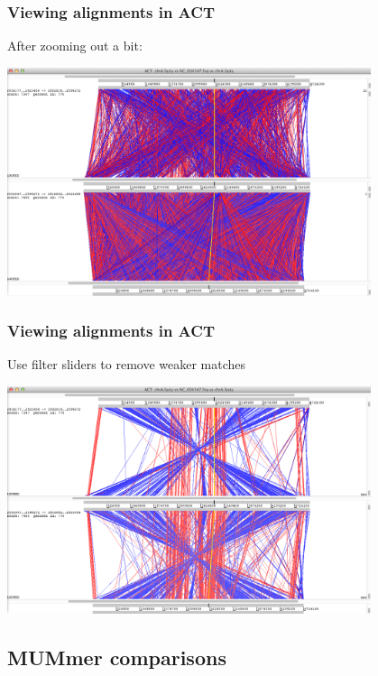 \documentclass[table]{beamer}
\begin{document}
    \begin{frame}
      \frametitle{Viewing alignments in ACT}
      After zooming out a bit:
      \begin{center}
        \includegraphics[width=0.8\textwidth]{images/act_wgs6}
      \end{center}
    \end{frame}

    \begin{frame}
      \frametitle{Viewing alignments in ACT}
      Use filter sliders to remove weaker matches
      \begin{center}
        \includegraphics[width=0.8\textwidth]{images/act_wgs7}
      \end{center}
    \end{frame}

\subsection{MUMmer comparisons}
\end{document}
